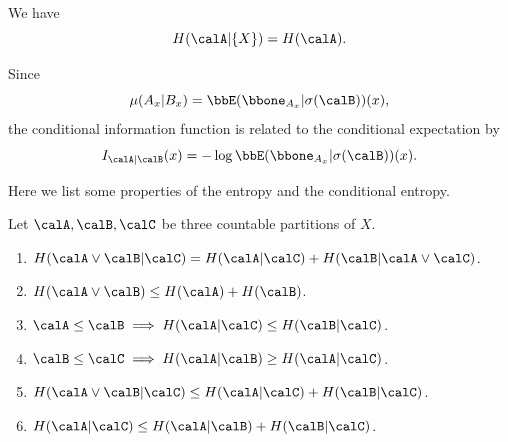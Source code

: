   We have 
  \[ H(\calA | \{X\}) = H(\calA). \]

  Since 
  \[ \mu(A_x | B_x) = \bbE(\bbone_{A_x} | \sigma(\calB))(x), \]
  the conditional information function is related to the conditional expectation by
  \[ I_{\calA | \calB}(x) = -\log \bbE(\bbone_{A_x} | \sigma(\calB))(x). \]


  Here we list some properties of the entropy and the conditional entropy.

  \begin{proposition}
    Let $\calA, \calB, \calC$ be three countable partitions of $X$. 
    \begin{enumerate}
      \item $H(\calA \vee \calB | \calC) = H(\calA | \calC) + H(\calB | \calA \vee \calC)$. 
      \item $H(\calA \vee \calB) \leq H(\calA) + H(\calB)$.
      \item $ \calA \leq \calB \implies H(\calA | \calC) \leq H(\calB | \calC)$.
      \item $ \calB \leq \calC \implies H(\calA | \calB) \geq H(\calA | \calC)$.
      \item $H(\calA \vee \calB | \calC) \leq H(\calA | \calC) + H(\calB | \calC)$.
      \item $H(\calA | \calC) \leq H(\calA | \calB) + H(\calB | \calC)$.
    \end{enumerate}
  \end{proposition}
